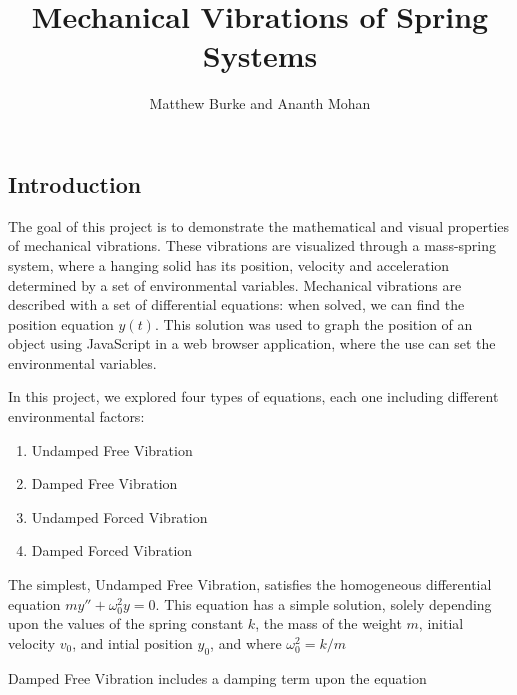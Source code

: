 \documentclass[11pt]{article} %
\title{Mechanical Vibrations of Spring Systems}
\author{Matthew Burke and Ananth Mohan}
\begin{document}
\maketitle

\begin{multicols}{2}

\begin{flushleft}
\section{Introduction}

The goal of this project is to demonstrate the mathematical and visual properties of mechanical vibrations. These vibrations are visualized through a mass-spring system, where a hanging solid has its position, velocity and acceleration determined by a set of environmental variables. Mechanical vibrations are described with a set of differential equations: when solved, we can find the position equation $y(t)$. This solution was used to graph the position of an object using JavaScript in a web browser application, where the use can set the environmental variables.

In this project, we explored four types of equations, each one including different environmental factors:
\begin{enumerate}
	\item Undamped Free Vibration

	\item Damped Free Vibration

	\item Undamped Forced Vibration

	\item Damped Forced Vibration
\end{enumerate} 

The simplest, Undamped Free Vibration, satisfies the homogeneous differential equation $my'' + \omega_0^2 y = 0$. This equation has a simple solution, solely depending upon the values of the spring constant $k$, the mass of the weight $m$, initial velocity $v_0$, and intial position $y_0$, and where $\omega_0^2 = k/m$

Damped Free Vibration includes a damping term upon the equation

\end{flushleft}

\section {}

\end{multicols}
\end{document}
